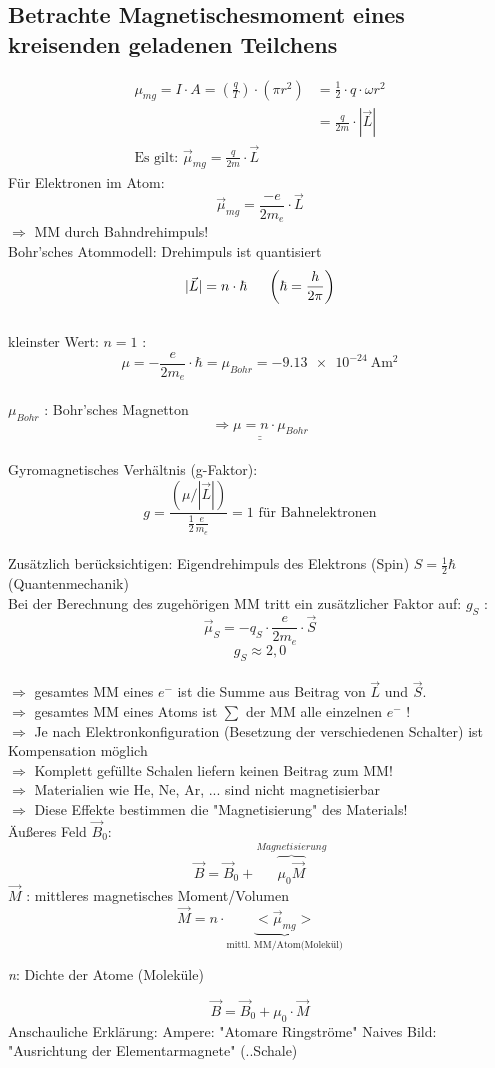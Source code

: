 \subsection{Betrachte Magnetischesmoment eines kreisenden geladenen Teilchens}
\bild
\begin{align*}
\mu_{mg} = I \cdot A = \left( \frac{q}{T} \right)  \cdot (\pi r^2) &= \frac{1}{2} \cdot q \cdot \omega r^2\\
&= \frac{q}{2m} \cdot |\vec{L}|\\
\text{Es gilt: } \vec{\mu}_{mg} = \frac{q}{2m} \cdot \vec{L}
\end{align*}
Für Elektronen im Atom:
$$ \boxed{\vec {\mu}_{mg} = \frac{-e}{2m_e} \cdot \vec{L} } $$
$ \Rightarrow $ MM durch Bahndrehimpuls!\\
Bohr'sches Atommodell: Drehimpuls ist quantisiert $$ |\vec{L}| = n\cdot \hbar \hspace{5mm} \left( \hbar = \frac{h}{2\pi}\right)  $$\\
kleinster Wert: $ n=1 $ : $$ \mu = -\frac{e}{2m_e}\cdot \hbar = \mu_{Bohr} = \SI{-9,13e-24}{\ampere\meter^2} $$\\
$ \mu_{Bohr} $ : Bohr'sches Magnetton $$ \underline{\underline{\Rightarrow \mu = n \cdot \mu_{Bohr}}} $$ \\
Gyromagnetisches Verhältnis (g-Faktor):
$$ g= \frac{(\mu/|\vec{L}|)}{\frac{1}{2}\frac{e}{m_e}} = 1 \text{ für Bahnelektronen} $$ \\
Zusätzlich berücksichtigen: Eigendrehimpuls des Elektrons (Spin) $ S=\frac{1}{2} \hbar $ (Quantenmechanik) \\
Bei der Berechnung des zugehörigen MM tritt ein zusätzlicher Faktor auf: $ g_S $ :
$$ \vec{\mu}_S = -q_S \cdot \frac{e}{2m_e} \cdot \vec{S} $$
$$ g_S \approx 2,0 $$ \\
$ \Rightarrow $ gesamtes MM eines $ e^- $ ist die Summe aus Beitrag von $ \vec{L} $ und $ \vec{S}$. \\
$ \Rightarrow $ gesamtes MM eines Atoms ist $ \sum $ der MM alle einzelnen $ e^- $ !\\
$ \Rightarrow $ Je nach Elektronkonfiguration (Besetzung der verschiedenen Schalter) ist Kompensation möglich \\
$ \Rightarrow $ Komplett gefüllte Schalen liefern keinen Beitrag zum MM! \\
$ \Rightarrow $ Materialien wie He, Ne, Ar, ... sind nicht magnetisierbar \\
$ \Rightarrow $ Diese Effekte bestimmen die "Magnetisierung" des Materials! \\ \break
Äußeres Feld $ \vec{B}_0 $:
$$ \vec{B} = \vec{B}_0 + \overbrace{\mu_0 \vec{M}}^{Magnetisierung} $$
$ \vec{M} $ : mittleres magnetisches Moment/Volumen
$$ \vec{M} = n\cdot \underbrace{<\vec{\mu}_{mg}>}_{\text{mittl. MM/Atom(Molekül)}} $$ \begin{flushright}
	\emph{n}: Dichte der Atome (Moleküle)
\end{flushright}
$$ \boxed{\vec{B} = \vec{B}_0 + \mu_0 \cdot \vec{M}} $$
Anschauliche Erklärung: Ampere: "Atomare Ringströme"
\bild
\bild
Naives Bild: "Ausrichtung der Elementarmagnete" (..Schale)\\ \break

